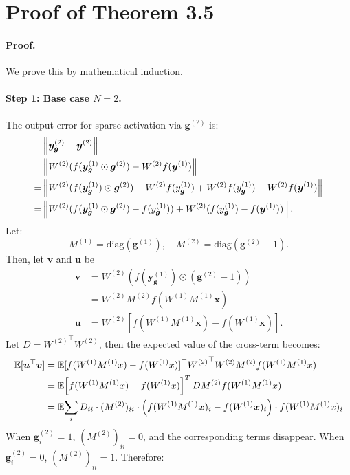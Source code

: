 \section{Proof of Theorem 3.5}

\paragraph{Proof.} We prove this by mathematical induction. 
\paragraph{Step 1: Base case $N=2$.}
The output error for sparse activation via $\bm{g}^{(2)}$ is:
\begin{align*}
	&\norm{\bm{y}_{\bm{g}}^{(2)} - \bm{y}^{(2)}} \\
	= &\norm{W^{(2)} (f(\bm{y}_{\bm{g}}^{(1)} \odot \bm{g}^{(2)}) - W^{(2)} f(\bm{y}^{(1)})} \\
	= &\norm{W^{(2)} (f(\bm{y}_{\bm{g}}^{(1)}) \odot \bm{g}^{(2)}) - W^{(2)}f(y_{\bm{g}}^{(1)}) + W^{(2)}f(y_{\bm{g}}^{(1)})-W^{(2)} f(\bm{y}^{(1)})} \\
	= &\norm{W^{(2)} (f(\bm{y}_{\bm{g}}^{(1)} \odot \bm{g}^{(2)}) - f(y_{\bm{g}}^{(1)})) + W^{(2)}(f(y_{\bm{g}}^{(1)})-f(\bm{y}^{(1)}))}.
\end{align*}
Let: 
$$
M^{(1)} = \text{diag}(\bm{g}^{(1)}), \quad M^{(2)} = \text{diag}(\bm{g}^{(2)}-1).
$$
Then, let $\bm{v}$ and $\bm{u}$ be
\begin{align*}
	\bm{v} &=W^{(2)}(f(\bm{y}_{\bm{g}}^{(1)})\odot(\bm{g}^{(2)}-1)) \\
	&=W^{(2)}M^{(2)}f(W^{(1)}M^{(1)}\bm{x})\\
	\bm{u} &=W^{(2)}[f(W^{(1)}M^{(1)}\bm{x})-f(W^{(1)}\bm{x})].
\end{align*}
Let $D={W^{(2)}}^\top W^{(2)}$, then the expected value of the cross-term becomes:
\begin{align*}
	\E[{\bm{u}^\top \bm{v}}] &= \E{[f(W^{(1)}M^{(1)}x)-f(W^{(1)}x)]^\top {W^{(2)}}^\top W^{(2)} M^{(2)} f(W^{(1)}M^{(1)}x)} \\
	& = \E{\left[ f(W^{(1)}M^{(1)}x) - f(W^{(1)}x) \right]^T D M^{(2)} f(W^{(1)}M^{(1)}x)} \\
	&=\E{ \sum_{i} D_{ii} \cdot (M^{(2)})_{ii} \cdot \left( f(W^{(1)}M^{(1)}\bm{x})_i - f(W^{(1)}\bm{x})_i \right)\cdot f(W^{(1)}M^{(1)}x)_i } 
\end{align*}
When $ \bm{g}^{(2)}_i = 1 $, $ (M^{(2)})_{ii} = 0 $, and the corresponding terms disappear. When $ \bm{g}^{(2)}_i = 0 $, $ (M^{(2)})_{ii} = 1 $. Therefore:
